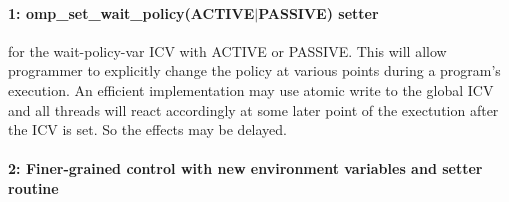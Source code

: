 \paragraph{1: {\sf omp\_set\_wait\_policy(ACTIVE$\vert$PASSIVE)} setter} for the wait-policy-var
ICV with ACTIVE or PASSIVE. This will allow programmer to explicitly change the policy at various 
points during a program's execution. An efficient implementation may use atomic write to the 
global ICV and all threads will react accordingly at some later point of the exectution after the 
ICV is set. So the effects may be delayed.

\paragraph{2: Finer-grained control with new environment variables and setter routine}


